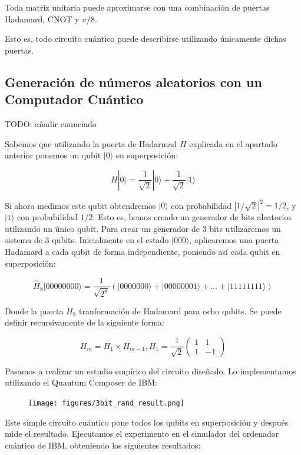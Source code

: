 \documentclass[11pt]{article}
\newcommand{\ra}{\rangle}
\newcommand{\ra}{\rangle}
\begin{document}
\begin{theorem}
	Toda matriz unitaria puede aproximarse con una combinación de puertas Hadamard, CNOT y $\pi/8$.
\end{theorem}

Esto es, todo circuito cuántico puede describirse utilizando únicamente dichas puertas.


\subsection{Generación de números aleatorios con un Computador Cuántico}


TODO: añadir enunciado

Sabemos que utilizando la puerta de Hadarmad $H$ explicada en el apartado anterior ponemos un qubit $|0\ra$ en superposición:

\[
	H|0\ra = \frac{1}{\sqrt 2} |0\ra + \frac{1}{\sqrt 2} |1\ra
\]

Si ahora medimos este qubit obtendremos $|0\ra$ con probabilidad $|1/\sqrt 2|^2 = 1/2$, y $|1\ra$ con probabilidad $1/2$. Esto es, hemos creado un generador de bits aleatorios utilizando un único qubit. Para crear un generador de 3 bits utilizaremos un sistema de 3 qubits. Inicialmente en el estado $|000\ra$, aplicaremos una puerta Hadamard a cada qubit de forma independiente, poniendo así cada qubit en superposición:

\[
	\hat H_8|00000000\ra = \frac{1}{\sqrt{2^8}}(|0000000\ra + |00000001\ra + \ldots + |11111111\ra)
\]

Donde la puerta $H_8$ tranformación de Hadamard para ocho qubits. Se puede definir recursivamente de la siguiente forma:

\[
	H_m = H_1 \times H_{m-1}, H_1 = \frac{1}{\sqrt 2}
	\begin{pmatrix}
		1 & 1 \\
		1 & -1 
	\end{pmatrix}
\]

Pasamos a realizar un estudio empírico del circuito diseñado. Lo implementamos utilizando el Quantum Composer de IBM:

\begin{figure}[H]
	\centering
	\texttt{[image: figures/3bit\_rand\_result.png]}
\end{figure}

Este simple circuito cuántico pone todos los qubits en superposición y después mide el resultado. Ejecutamos el experimento en el simulador del ordenador cuántico de IBM, obteniendo los siguientes resultados:
\end{document}
